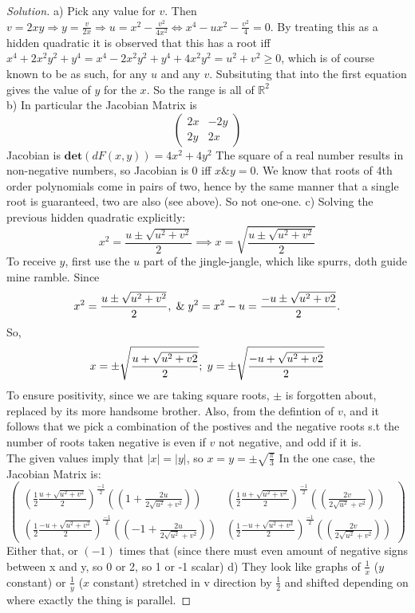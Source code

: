 \documentclass{article}
\newcommand{\R}{\mathbb{R}}
\newcommand{\ma}[1]{\mathbf{#1}}
\newenvironment{problem}[2][Problem]{\begin{trivlist}
\item[\hskip \labelsep {\bfseries #1}\hskip \labelsep {\bfseries #2.}]}{\end{trivlist}}
\newenvironment{solution}{\begin{proof}[Solution]}{\end{proof}}
\begin{document}
\begin{problem}{9.18}
\end{problem}
\begin{solution}
    a) Pick any value for $v$. Then $v =2xy \Rightarrow y = \frac{v}{2x} \Rightarrow u = x^2 -\frac{v^2}{4x^2} \iff x^4 -ux^{2} - \frac{v^2}{4} = 0$. By treating this as a hidden quadratic it is observed that this has a root iff $x^4 +2x^{2}y^{2} +y^{4} = x^{4} - 2x^{2}y^{2} + y^{4} +4x^{2}y^{2} = u^2 + v^2 \geq 0$, which is of course known to be as such, for any $u$ and any $v$. Subsituting that into the first equation gives the value of $y$ for the $x$. So the range is all of $\R^2$
  \\
    b) In particular the Jacobian Matrix is 
    \[
    \begin{pmatrix}
        2x & -2y \\
        2y & 2x
    \end{pmatrix}
    \]
    Jacobian is $\ma{det}(dF(x, y)) = 4x^2 +4y^2$  The square of a real number results in non-negative numbers, so Jacobian is 0 iff $x \& y = 0$. We know that roots of 4th order polynomials come in pairs of two, hence by the same manner that a single root is guaranteed, two are also (see above). So not one-one.
    c) Solving the previous hidden quadratic explicitly: 
    \[
    x^{2} = {\frac{u\pm\sqrt{u^{2}+v^{2}}}{2}} \implies x = \sqrt{\frac{u\pm\sqrt{u^{2}+v^{2}}}{2}}
    \]
    To receive $y$, first use the $u$ part of the jingle-jangle, which like spurrs, doth guide mine ramble. Since
    \[
    x^{2} = \frac{u \pm \sqrt{u^{2}+v^{2}}}{2}, \hspace{1mm} \& \hspace{1mm} y^{2} = x^{2} - u = \frac{-u \pm \sqrt{u^{2}+v{2}}}{2}.
     \]
    So, 
    \[
    x = \pm \sqrt{\frac{u + \sqrt{u^{2}+v{2}}}{2}}; \hspace{1mm} y = \pm \sqrt{\frac{-u + \sqrt{u^{2}+v{2}}}{2}}
    \]
    To ensure positivity, since we are taking square roots, $\pm$ is forgotten about, replaced by its more handsome brother. Also, from the defintion of $v$, and it follows that we pick a combination of the postives and the negative roots s.t the number of roots taken negative is even if $v$ not negative, and odd if it is.
    \\
    The given values imply that $|x| = |y|$, so $x = y = \pm \sqrt{\frac{\pi}{3}}$
    In the one case, the Jacobian Matrix is:
    \[
    \begin{pmatrix}
        \left( \frac{1}{2}\frac{u +\sqrt{u^{2} + v^{2}}}{2}\right)^{\frac{-1}{2}}\left((1+\frac{2u}{2\sqrt{u^{2}}+v^{2}})\right)  & \left( \frac{1}{2}\frac{u +\sqrt{u^{2} + v^{2}}}{2}\right)^{\frac{-1}{2}}\left((\frac{2v}{2\sqrt{u^{2}}+v^{2}})\right)\\
        \left( \frac{1}{2}\frac{-u +\sqrt{u^{2} + v^{2}}}{2}\right)^{\frac{-1}{2}}\left((-1+\frac{2u}{2\sqrt{u^{2}}+v^{2}})\right)   &\left( \frac{1}{2}\frac{-u +\sqrt{u^{2} + v^{2}}}{2}\right)^{\frac{-1}{2}}\left((\frac{2v}{2\sqrt{u^{2}}+v^{2}})\right)
    \end{pmatrix}
    \]
    Either that, or $(-1)$ times that (since there must even amount of negative signs between x and y, so 0 or 2, so 1 or -1 scalar)
    d) They look like graphs of $\frac{1}{x}$ ($y$ constant) or $\frac{1}{y}$ ($x$ constant) stretched in v direction by $\frac{1}{2}$ and shifted depending on where exactly the thing is parallel.
\end{solution}
\end{document}
